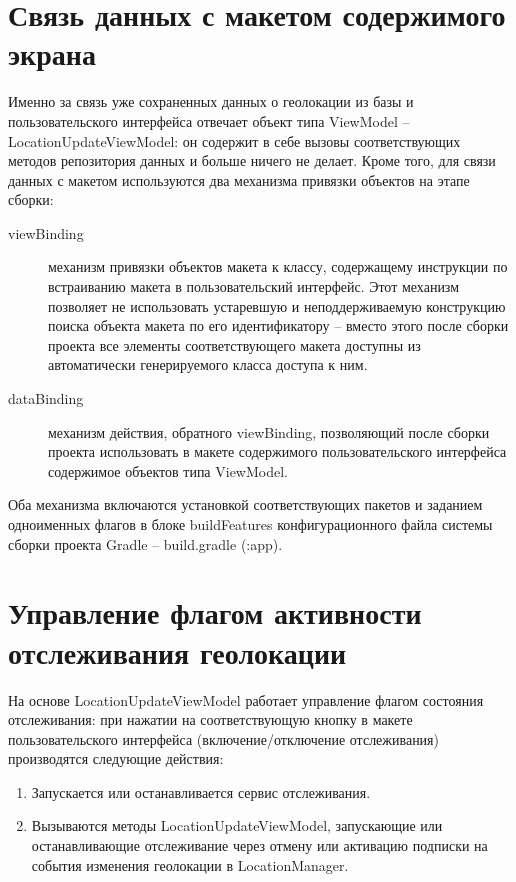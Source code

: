 \section{Связь данных с макетом содержимого экрана}
Именно за связь уже сохраненных данных о геолокации из базы и пользовательского интерфейса отвечает объект типа ViewModel – LocationUpdateViewModel: он содержит в себе вызовы соответствующих методов репозитория данных и больше ничего не делает.
Кроме того, для связи данных с макетом используются два механизма привязки объектов на этапе сборки:
\begin{description}
	\item[viewBinding] механизм привязки объектов макета к классу, содержащему инструкции по встраиванию макета в пользовательский интерфейс. Этот механизм позволяет не использовать устаревшую и неподдерживаемую конструкцию поиска объекта макета по его идентификатору – вместо этого после сборки проекта все элементы соответствующего макета доступны из автоматически генерируемого класса доступа к ним.
	\item[dataBinding] механизм действия, обратного viewBinding, позволяющий после сборки проекта использовать в макете содержимого пользовательского интерфейса содержимое объектов типа ViewModel.
\end{description}
\smallskip
Оба механизма включаются установкой соответствующих пакетов и заданием одноименных флагов в блоке buildFeatures конфигурационного файла системы сборки проекта Gradle – build.gradle (:app).


\section{Управление флагом активности отслеживания геолокации}
На основе LocationUpdateViewModel работает управление флагом состояния отслеживания: при нажатии на соответствующую кнопку в макете пользовательского интерфейса (включение/отключение отслеживания) производятся следующие действия:
\begin{enumerate}
	\item Запускается или останавливается сервис отслеживания.
	\item Вызываются методы LocationUpdateViewModel, запускающие или останавливающие отслеживание через отмену или активацию подписки на события изменения геолокации в LocationManager.
\end{enumerate}
